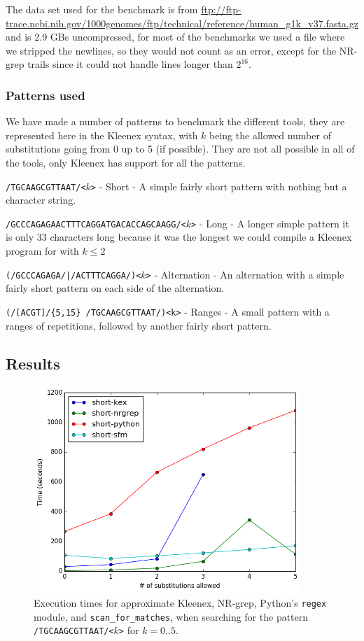 The data set used for the benchmark is from
\url{ftp://ftp-trace.ncbi.nih.gov/1000genomes/ftp/technical/reference/human_g1k_v37.fasta.gz}
and is 2.9 GBs uncompressed, for most of the benchmarks we used a file where we
stripped the newlines, so they would not count as an error, except for the
NR-grep trails since it could not handle lines longer than $2^{16}$.

\subsubsection{Patterns used}
We have made a number of patterns to benchmark the different tools, they are
represented here in the Kleenex syntax, with $k$ being the allowed number of
substitutions going from 0 up to 5 (if possible). They are not all possible in
all of the tools, only Kleenex has support for all the patterns.

\texttt{/TGCAAGCGTTAAT/<$k$>} - Short - A simple fairly short pattern with
nothing but a character string.

\texttt{/GCCCAGAGAACTTTCAGGATGACACCAGCAAGG/<$k$>} - Long - A longer simple
pattern it is only 33 characters long because it was the longest we could
compile a Kleenex program for with $k \leq 2$

\texttt{(/GCCCAGAGA/|/ACTTTCAGGA/)<$k$>} - Alternation - An alternation with a
simple fairly short pattern on each side of the alternation.

\texttt{(/[ACGT]/\{5,15\} /TGCAAGCGTTAAT/)<k>} - Ranges - A small pattern with
a ranges of repetitions, followed by another fairly short pattern.

\subsection{Results}

\begin{figure}[!ht]
  \centering
  \includegraphics[width=0.9\textwidth]{images/short.png}
  \caption{Execution times for approximate Kleenex, NR-grep, Python's
    \texttt{regex} module, and \texttt{scan\_for\_matches}, when searching for
    the pattern \texttt{/TGCAAGCGTTAAT/<$k$>} for $k=0..5$.}
  \label{fig:short}
\end{figure}

